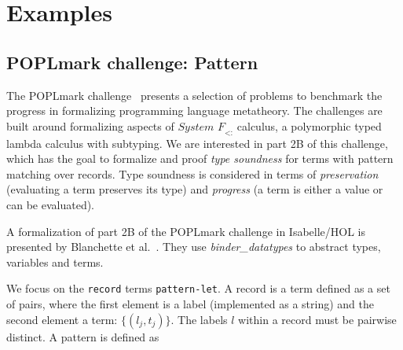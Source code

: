 
\chapter{Examples}
\label{chapter:examples}

  \section{POPLmark challenge: Pattern}
    The POPLmark challenge~\cite{aydemir2005mechanized} presents a selection of problems to benchmark the progress in formalizing programming language metatheory. The challenges are built around formalizing aspects of $\textit{System F}_\textit{<:}$ calculus, a polymorphic typed lambda calculus with subtyping. We are interested in part 2B of this challenge, which has the goal to formalize and proof \textit{type soundness} for terms with pattern matching over records. Type soundness is considered in terms of \textit{preservation} (evaluating a term preserves its type) and \textit{progress} (a term is either a value or can be evaluated).

    A formalization of part 2B of the POPLmark challenge in Isabelle/HOL is presented by Blanchette et al.~\cite{blanchette2019bindings}. They use \textit{binder\_datatypes} to abstract types, variables and terms.

    We focus on the \texttt{record} terms \texttt{pattern-let}. 
    A record is a term defined as a set of pairs, where the first element is a label (implemented as a string) and the second element a term: $\{(l_j, t_j)\}$. The labels $l$ within a record must be pairwise distinct.
    A pattern is defined as 

